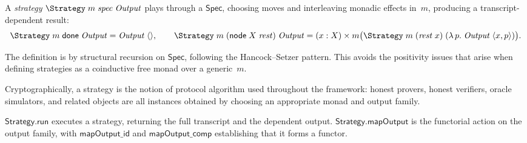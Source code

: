 \begin{definition}[Strategy]
  \label{int:strategy}
  A \emph{strategy} $\Strategy\;m\;\mathit{spec}\;\mathit{Output}$ plays
  through a $\mathsf{Spec}$, choosing moves and interleaving monadic effects
  in~$m$, producing a transcript-dependent result:
  \[
    \Strategy\;m\;\mathsf{done}\;\mathit{Output}
      = \mathit{Output}\;\langle\rangle, \qquad
    \Strategy\;m\;(\mathsf{node}\;X\;\mathit{rest})\;\mathit{Output}
      = (x : X) \times m\bigl(\Strategy\;m\;(\mathit{rest}\;x)\;
        (\lambda\,p.\;\mathit{Output}\;\langle x,p\rangle)\bigr).
  \]
\end{definition}

The definition is by structural recursion on $\mathsf{Spec}$, following the
Hancock--Setzer pattern.  This avoids the positivity issues that arise when
defining strategies as a coinductive free monad over a generic~$m$.

Cryptographically, a strategy is the notion of protocol algorithm used
throughout the framework: honest provers, honest verifiers, oracle simulators,
and related objects are all instances obtained by choosing an appropriate monad
and output family.

$\mathsf{Strategy.run}$ executes a strategy, returning the full transcript
and the dependent output.  $\mathsf{Strategy.mapOutput}$ is the functorial
action on the output family, with $\mathsf{mapOutput\_id}$ and
$\mathsf{mapOutput\_comp}$ establishing that it forms a functor.
